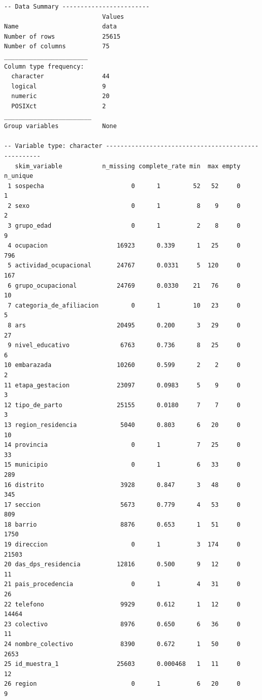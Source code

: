 \documentclass[
  letterpaper,
  DIV=11,
  numbers=noendperiod]{scrreprt}
\begin{document}
\begin{verbatim}
-- Data Summary ------------------------
                           Values
Name                       data  
Number of rows             25615 
Number of columns          75    
_______________________          
Column type frequency:           
  character                44    
  logical                  9     
  numeric                  20    
  POSIXct                  2     
________________________         
Group variables            None  

-- Variable type: character ----------------------------------------------------
   skim_variable           n_missing complete_rate min  max empty n_unique
 1 sospecha                        0      1         52   52     0        1
 2 sexo                            0      1          8    9     0        2
 3 grupo_edad                      0      1          2    8     0        9
 4 ocupacion                   16923      0.339      1   25     0      796
 5 actividad_ocupacional       24767      0.0331     5  120     0      167
 6 grupo_ocupacional           24769      0.0330    21   76     0       10
 7 categoria_de_afiliacion         0      1         10   23     0        5
 8 ars                         20495      0.200      3   29     0       27
 9 nivel_educativo              6763      0.736      8   25     0        6
10 embarazada                  10260      0.599      2    2     0        2
11 etapa_gestacion             23097      0.0983     5    9     0        3
12 tipo_de_parto               25155      0.0180     7    7     0        3
13 region_residencia            5040      0.803      6   20     0       10
14 provincia                       0      1          7   25     0       33
15 municipio                       0      1          6   33     0      289
16 distrito                     3928      0.847      3   48     0      345
17 seccion                      5673      0.779      4   53     0      809
18 barrio                       8876      0.653      1   51     0     1750
19 direccion                       0      1          3  174     0    21503
20 das_dps_residencia          12816      0.500      9   12     0       11
21 pais_procedencia                0      1          4   31     0       26
22 telefono                     9929      0.612      1   12     0    14464
23 colectivo                    8976      0.650      6   36     0       11
24 nombre_colectivo             8390      0.672      1   50     0     2653
25 id_muestra_1                25603      0.000468   1   11     0       12
26 region                          0      1          6   20     0        9

\end{verbatim}
\end{document}
